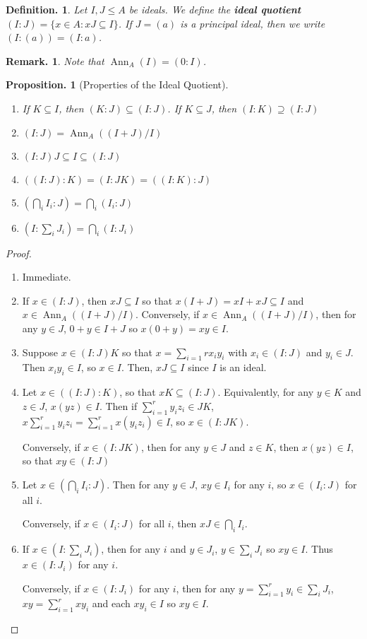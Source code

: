 \documentclass[11pt, a4paper]{memoir}
\theoremstyle{change}
\newtheorem{proposition}[theorem]{Proposition.}
\theoremstyle{plain}
\theoremstyle{nonumberplain}
\newtheorem{definition}{Definition.}
\newtheorem{remark}{Remark.}
\newtheorem{proof}{Proof}
\DeclareMathOperator{\Ann}{Ann}
\numberwithin{equation}{section}
\begin{document}
\begin{definition}
    Let $I,J\leq A$ be ideals.
    We define the \textbf{ideal quotient} $(I:J)=\{x\in A:xJ\subseteq I\}$.
    If $J=(a)$ is a principal ideal, then we write $(I:(a))=(I:a)$.
\end{definition}
\begin{remark}
    Note that $\Ann_A(I)=(0:I)$.
\end{remark}
\begin{proposition}[Properties of the Ideal Quotient]\label{lem:col}
    \begin{enumerate}[nl,r]
        \item If $K\subseteq I$, then $(K:J)\subseteq(I:J)$.
            If $K\subseteq J$, then $(I:K)\supseteq(I:J)$
        \item $(I:J)=\Ann_A((I+J)/I)$
        \item $(I:J)J\subseteq I\subseteq (I:J)$
        \item $((I:J):K)=(I:JK)=((I:K):J)$
        \item $\left(\bigcap_i I_i:J\right)=\bigcap_i(I_i:J)$
        \item $\left(I:\sum_i J_i\right)=\bigcap_i(I:J_i)$
    \end{enumerate}
\end{proposition}
\begin{proof}
    \begin{enumerate}[nl,r]
        \item Immediate.
        \item If $x\in(I:J)$, then $xJ\subseteq I$ so that $x(I+J)=xI+xJ\subseteq I$ and $x\in\Ann_A((I+J)/I)$.
            Conversely, if $x\in\Ann_A((I+J)/I)$, then for any $y\in J$, $0+y\in I+J$ so $x(0+y)=xy\in I$.
        \item Suppose $x\in (I:J)K$ so that $x=\sum_{i=1}r x_iy_i$ with $x_i\in(I:J)$ and $y_i\in J$.
            Then $x_iy_i\in I$, so $x\in I$.
            Then, $xJ\subseteq I$ since $I$ is an ideal.
        \item Let $x\in((I:J):K)$, so that $xK\subseteq (I:J)$.
            Equivalently, for any $y\in K$ and $z\in J$, $x(yz)\in I$.
            Then if $\sum_{i=1}^r y_iz_i\in JK$, $x\sum_{i=1}^r y_iz_i=\sum_{i=1}^r x(y_iz_i)\in I$, so $x\in (I:JK)$.

            Conversely, if $x\in (I:JK)$, then for any $y\in J$ and $z\in K$, then $x(yz)\in I$, so that $xy\in (I:J)$
        \item Let $x\in\left(\bigcap_i I_i:J\right)$.
            Then for any $y\in J$, $xy\in I_i$ for any $i$, so $x\in (I_i:J)$ for all $i$.

            Conversely, if $x\in (I_i:J)$ for all $i$, then $xJ\in\bigcap_i I_i$.
        \item If $x\in\left(I:\sum_i J_i\right)$, then for any $i$ and $y\in J_i$, $y\in \sum_i J_i$ so $xy\in I$.
            Thus $x\in (I:J_i)$ for any $i$.

            Conversely, if $x\in (I:J_i)$ for any $i$, then for any $y=\sum_{i=1}^r y_i\in\sum_i J_i$, $xy=\sum_{i=1}^r xy_i$ and each $xy_i\in I$ so $xy\in I$.
    \end{enumerate}
\end{proof}
\end{document}
